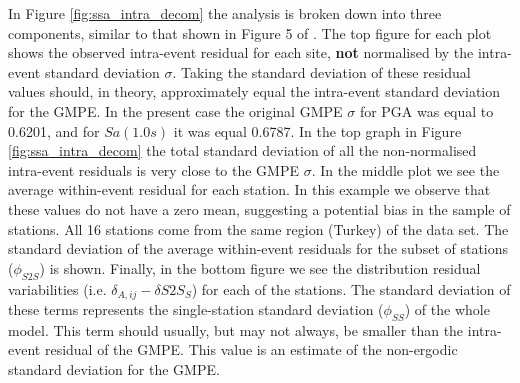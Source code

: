 In Figure \ref{fig:ssa_intra_decom} the analysis is broken down into three components, similar to that shown in Figure 5 of \textcite{RodriguezMarek_etal2011}. The top figure for each plot shows the observed intra-event residual for each site, \textbf{not} normalised by the intra-event standard deviation $\sigma$. Taking the standard deviation of these residual values should, in theory, approximately equal the intra-event standard deviation for the GMPE. In the present case the original GMPE $\sigma$ for PGA was equal to 0.6201, and for $Sa \left( {1.0s} \right)$ it was equal 0.6787. In the top graph in Figure \ref{fig:ssa_intra_decom} the total standard deviation of all the non-normalised intra-event residuals is very close to the GMPE $\sigma$. In the middle plot we see the average within-event residual for each station. In this example we observe that these values do not have a zero mean, suggesting a potential bias in the sample of stations. All 16 stations come from the same region (Turkey) of the data set. The standard deviation of the average within-event residuals for the subset of stations ($\phi_{S2S}$) is shown. Finally, in the bottom figure we see the distribution residual variabilities (i.e. $\delta_{A,ij} - \delta S2S_S$) for each of the stations. The standard deviation of these terms represents the single-station standard deviation ($\phi_{SS}$) of the whole model. This term should usually, but may not always, be smaller than the intra-event residual of the GMPE. This value is an estimate of the non-ergodic standard deviation for the GMPE. 



